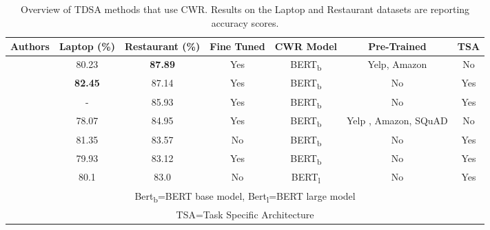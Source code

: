 \begin{table}
\centering
\begin{tabular}{|c|c|c|c|c|c|c|}
\hline
Authors & Laptop (\%) & Restaurant (\%) & Fine Tuned &  CWR Model & Pre-Trained & TSA \\
\hline
\cite{rietzler2019adapt}   & 80.23 &  \textbf{87.89} &  Yes &  BERT\textsubscript{b} & Yelp, Amazon & No \\
\hline
\cite{zeng2019lcf}   & \textbf{82.45} &  87.14 &  Yes &  BERT\textsubscript{b} & No & Yes \\
\hline
\cite{jiang-etal-2019-challenge}   & - &  85.93 &  Yes &  BERT\textsubscript{b} & No & Yes \\
\hline
\cite{xu-etal-2019-bert}   & 78.07 & 84.95  &  Yes &  BERT\textsubscript{b} & Yelp , Amazon, SQuAD & No \\
\hline
\cite{zhao2019modeling}   & 81.35 &  83.57 &  No &  BERT\textsubscript{b} & No & Yes \\
\hline
\cite{song2019attentional}   & 79.93 &  83.12 &  Yes &  BERT\textsubscript{b} & No & Yes \\
\hline
\cite{huang-carley-2019-syntax}   & 80.1 &  83.0 &  No &  BERT\textsubscript{l} & No & Yes \\
\hline
\multicolumn{7}{|c|}{Bert\textsubscript{b}=BERT base model, Bert\textsubscript{l}=BERT large model \citep{devlin-etal-2019-bert}} \\
\multicolumn{7}{|c|}{TSA=Task Specific Architecture} \\
\hline
\end{tabular}
\caption{Overview of TDSA methods that use CWR. Results on the Laptop and Restaurant datasets are reporting accuracy scores.}
\label{table:aug_cwr_tdsa_cwr_methods_overview}
\end{table}
